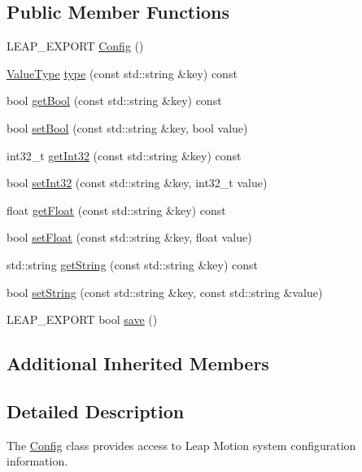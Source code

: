 \subsection*{Public Member Functions}
\begin{DoxyCompactItemize}
\item 
L\+E\+A\+P\+\_\+\+E\+X\+P\+O\+RT \hyperlink{class_leap_1_1_config_aee58922e575e3e59ddf8da5af4f07878}{Config} ()
\item 
\hyperlink{class_leap_1_1_config_aee9819af7eacacc324aa72619310a9d8}{Value\+Type} \hyperlink{class_leap_1_1_config_a40c2f5140b3addfa75bb9a709ce4b146}{type} (const std\+::string \&key) const
\item 
bool \hyperlink{class_leap_1_1_config_a3e0138c769238325479fd19ff78ae586}{get\+Bool} (const std\+::string \&key) const
\item 
bool \hyperlink{class_leap_1_1_config_a98b3f1b4a5b306aa8c404bdd49276554}{set\+Bool} (const std\+::string \&key, bool value)
\item 
int32\+\_\+t \hyperlink{class_leap_1_1_config_ad6d888ed2ce56b865d96327f23f0c547}{get\+Int32} (const std\+::string \&key) const
\item 
bool \hyperlink{class_leap_1_1_config_ab7d1ab1b142d9a14b83f1342844d39e8}{set\+Int32} (const std\+::string \&key, int32\+\_\+t value)
\item 
float \hyperlink{class_leap_1_1_config_a7f1be89c6eb18bec45e9692666b594e9}{get\+Float} (const std\+::string \&key) const
\item 
bool \hyperlink{class_leap_1_1_config_a67112a0e19a0fd8d9844a2c3824a187e}{set\+Float} (const std\+::string \&key, float value)
\item 
std\+::string \hyperlink{class_leap_1_1_config_a3fc69b478925aa6a7a010b103e0b96f7}{get\+String} (const std\+::string \&key) const
\item 
bool \hyperlink{class_leap_1_1_config_a8daa90073c65525abc477dc8b1b62343}{set\+String} (const std\+::string \&key, const std\+::string \&value)
\item 
L\+E\+A\+P\+\_\+\+E\+X\+P\+O\+RT bool \hyperlink{class_leap_1_1_config_ae1187e2b9992706d2a3eb071cc2f71c4}{save} ()
\end{DoxyCompactItemize}
\subsection*{Additional Inherited Members}


\subsection{Detailed Description}
The \hyperlink{class_leap_1_1_config}{Config} class provides access to Leap Motion system configuration information.

